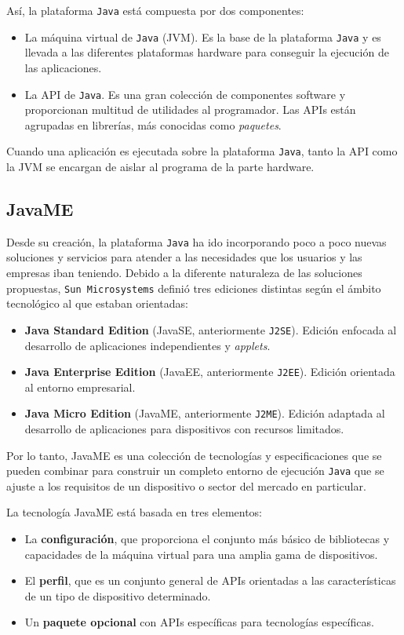 Así, la plataforma \texttt{Java} está compuesta por dos componentes:
\begin{itemize}
\item La máquina virtual de \texttt{Java} (\acs{JVM}). Es la base de la 
plataforma \texttt{Java} y es llevada a las diferentes plataformas hardware
para conseguir la ejecución de las aplicaciones.
\item La \acs{API} de \texttt{Java}. Es una gran colección de componentes
software y proporcionan multitud de utilidades al programador. Las \acs{API}s
están agrupadas en librerías, más conocidas como \emph{paquetes}.
\end{itemize}

Cuando una aplicación es ejecutada sobre la plataforma \texttt{Java}, tanto la
\acs{API} como la \acs{JVM} se encargan de aislar al programa de la parte
hardware.

\subsection{JavaME}
Desde su creación, la plataforma \texttt{Java} ha ido incorporando poco a poco
nuevas soluciones y servicios para atender a las necesidades que los usuarios y 
las empresas iban teniendo. Debido a la diferente naturaleza de las soluciones
propuestas, \texttt{Sun Microsystems} definió tres ediciones distintas
según el ámbito tecnológico al que estaban orientadas:

\begin{itemize}
\item \textbf{Java Standard Edition} (\acs{JavaSE}, anteriormente
\texttt{J2SE}). Edición enfocada al desarrollo de aplicaciones independientes y
\emph{applets}.
\item \textbf{Java Enterprise Edition} (\acs{JavaEE}, anteriormente
\texttt{J2EE}). Edición orientada al entorno empresarial.
\item \textbf{Java Micro Edition} (\acs{JavaME}, anteriormente \texttt{J2ME}). 
Edición adaptada al desarrollo de aplicaciones para dispositivos con recursos 
limitados.
\end{itemize}

Por lo tanto, \acs{JavaME} es una colección de tecnologías y especificaciones
que se pueden combinar para construir un completo entorno de ejecución
\texttt{Java} que se ajuste a los requisitos de un dispositivo o sector del 
mercado en particular.

La tecnología \acs{JavaME} está basada en tres elementos:
\begin{itemize}
\item La \textbf{configuración}, que proporciona el conjunto más básico de
bibliotecas y capacidades de la máquina virtual para una amplia gama de
dispositivos.
\item El \textbf{perfil}, que es un conjunto general de \acs{API}s orientadas a
las características de un tipo de dispositivo determinado.
\item Un \textbf{paquete opcional} con \acs{API}s específicas para tecnologías
específicas.
\end{itemize}


